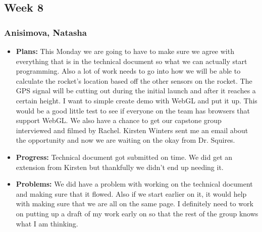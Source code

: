 \documentclass[10pt,draftclsnofoot,onecolumn]{IEEEtran}
\begin{document}
\subsection{Week 8}
\subsubsection{Anisimova, Natasha}
\begin{itemize}
	\item \textbf{Plans: }
	This Monday we are going to have to make sure we agree with everything that is in the technical document so what we can actually start programming. Also a lot of work needs to go into how we will be able to calculate the rocket's location based off the other sensors on the rocket. The GPS signal will be cutting out during the initial launch and after it reaches a certain height. I want to simple create demo with WebGL and put it up. This would be a good little test to see if everyone on the team has browsers that support WebGL. We also have a chance to get our capstone group interviewed and filmed by Rachel. Kirsten Winters sent me an email about the opportunity and now we are waiting on the okay from Dr. Squires.
	\item \textbf{Progress: }
	Technical document got submitted on time. We did get an extension from Kirsten but thankfully we didn't end up needing it.
	\item \textbf{Problems: }
	We did have a problem with working on the technical document and making sure that it flowed. Also if we start earlier on it, it would help with making sure that we are all on the same page. I definitely need to work on putting up a draft of my work early on so that the rest of the group knows what I am thinking.
\end{itemize}
\end{document}
